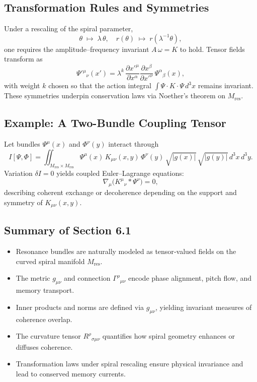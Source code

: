 \subsection{Transformation Rules and Symmetries}

Under a rescaling of the spiral parameter,
\[
  \theta \;\mapsto\; \lambda\,\theta,\quad
  r(\theta)\;\mapsto\;r(\lambda^{-1}\theta),
\]
one requires the amplitude–frequency invariant \(A\,\omega=K\) to hold.  Tensor fields transform as
\[
  \Psi'{}^{\mu}{}_{\nu}(x')
  = \lambda^{k}\,
    \frac{\partial x'^{\mu}}{\partial x^{\alpha}}
    \frac{\partial x^{\beta}}{\partial x'^{\nu}}
    \,\Psi^{\alpha}{}_{\beta}(x),
\]
with weight \(k\) chosen so that the action integral
\(\int \Psi\cdot K\cdot\Psi \,d^{3}x\) remains invariant.  These symmetries underpin conservation laws via Noether’s theorem on \(M_{\mathrm{res}}\).

\subsection{Example: A Two-Bundle Coupling Tensor}

Let bundles \(\Psi^{\mu}(x)\) and \(\Phi^{\nu}(y)\) interact through
\[
  I[\Psi,\Phi]
  = \iint_{M_{\mathrm{res}}\times M_{\mathrm{res}}}
    \Psi^{\mu}(x)\,
    K_{\mu\nu}(x,y)\,
    \Phi^{\nu}(y)\,
    \sqrt{|g(x)|}\,\sqrt{|g(y)|}\,
    d^{3}x\,d^{3}y.
\]
Variation \(\delta I=0\) yields coupled Euler–Lagrange equations:
\[
  \nabla_{\mu}\bigl(K^{\mu}{}_{\nu}\ast \Psi^{\nu}\bigr)
  = 0,
\]
describing coherent exchange or decoherence depending on the support and symmetry of \(K_{\mu\nu}(x,y)\).

\subsection*{Summary of Section 6.1}

\begin{itemize}
  \item Resonance bundles are naturally modeled as tensor‐valued fields on the curved spiral manifold \(M_{\mathrm{res}}\).
  \item The metric \(g_{\mu\nu}\) and connection \(\Gamma^{\rho}{}_{\mu\nu}\) encode phase alignment, pitch flow, and memory transport.
  \item Inner products and norms are defined via \(g_{\mu\nu}\), yielding invariant measures of coherence overlap.
  \item The curvature tensor \(R^{\rho}{}_{\sigma\mu\nu}\) quantifies how spiral geometry enhances or diffuses coherence.
  \item Transformation laws under spiral rescaling ensure physical invariance and lead to conserved memory currents.
\end{itemize}

